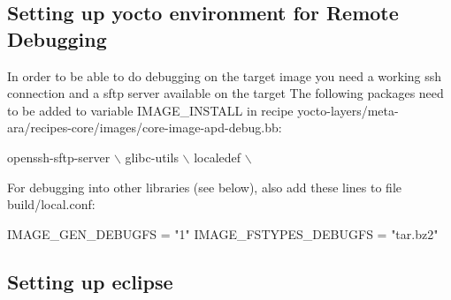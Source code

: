 \subsection*{Setting up yocto environment for Remote Debugging}


\begin{DoxyItemize}
\item In order to be able to do debugging on the target image you need a working ssh connection and a sftp server available on the target The following packages need to be added to variable I\+M\+A\+G\+E\+\_\+\+I\+N\+S\+T\+A\+LL in recipe yocto-\/layers/meta-\/ara/recipes-\/core/images/core-\/image-\/apd-\/debug.\+bb\+: 
\begin{DoxyCode}
openssh-sftp-server \(\backslash\) 
glibc-utils \(\backslash\) 
localedef \(\backslash\)
\end{DoxyCode}

\item For debugging into other libraries (see below), also add these lines to file build/local.\+conf\+: 
\begin{DoxyCode}
IMAGE\_GEN\_DEBUGFS = "1"
IMAGE\_FSTYPES\_DEBUGFS = "tar.bz2"
\end{DoxyCode}

\end{DoxyItemize}

\subsection*{Setting up eclipse}


